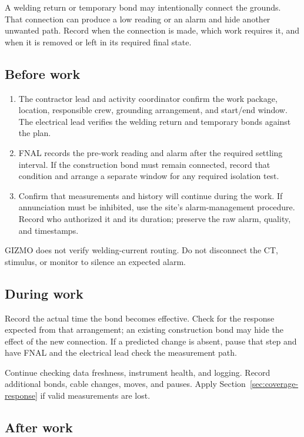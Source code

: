 \documentclass[11pt]{article}
\begin{document}
A welding return or temporary bond may intentionally connect the grounds. That connection can produce a low reading or an alarm and hide another unwanted path. Record when the connection is made, which work requires it, and when it is removed or left in its required final state.

\subsection{Before work}

\begin{enumerate}
  \item The contractor lead and activity coordinator confirm the work package, location, responsible crew, grounding arrangement, and start/end window. The electrical lead verifies the welding return and temporary bonds against the plan.
  \item FNAL records the pre-work reading and alarm after the required settling interval. If the construction bond must remain connected, record that condition and arrange a separate window for any required isolation test.
  \item Confirm that measurements and history will continue during the work. If annunciation must be inhibited, use the site's alarm-management procedure. Record who authorized it and its duration; preserve the raw alarm, quality, and timestamps.
\end{enumerate}

GIZMO does not verify welding-current routing. Do not disconnect the CT, stimulus, or monitor to silence an expected alarm.

\subsection{During work}

Record the actual time the bond becomes effective. Check for the response expected from that arrangement; an existing construction bond may hide the effect of the new connection. If a predicted change is absent, pause that step and have FNAL and the electrical lead check the measurement path.

Continue checking data freshness, instrument health, and logging. Record additional bonds, cable changes, moves, and pauses. Apply Section~\ref{sec:coverage-response} if valid measurements are lost.

\subsection{After work}
\end{document}
